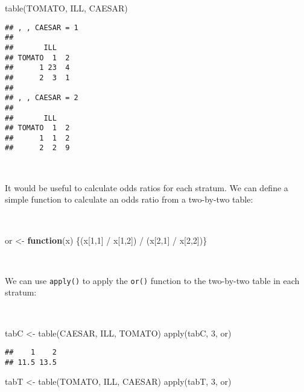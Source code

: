 \documentclass[
  12pt,
  a4paper]{book}
\newenvironment{Shaded}{\begin{snugshade}}{\end{snugshade}}
\newcommand{\ControlFlowTok}[1]{\textcolor[rgb]{0.13,0.29,0.53}{\textbf{#1}}}
\newcommand{\DecValTok}[1]{\textcolor[rgb]{0.00,0.00,0.81}{#1}}
\newcommand{\FunctionTok}[1]{\textcolor[rgb]{0.00,0.00,0.00}{#1}}
\newcommand{\NormalTok}[1]{#1}
\newcommand{\OtherTok}[1]{\textcolor[rgb]{0.56,0.35,0.01}{#1}}
\newcommand{\SpecialCharTok}[1]{\textcolor[rgb]{0.00,0.00,0.00}{#1}}
\begin{document}
\newpage

\begin{Shaded}
\begin{Highlighting}[]
\FunctionTok{table}\NormalTok{(TOMATO, ILL, CAESAR)}
\end{Highlighting}
\end{Shaded}

\begin{verbatim}
## , , CAESAR = 1
## 
##       ILL
## TOMATO  1  2
##      1 23  4
##      2  3  1
## 
## , , CAESAR = 2
## 
##       ILL
## TOMATO  1  2
##      1  1  2
##      2  2  9
\end{verbatim}

~

It would be useful to calculate odds ratios for each stratum. We can define a simple function to calculate an odds ratio from a two-by-two table:

~

\begin{Shaded}
\begin{Highlighting}[]
\NormalTok{or }\OtherTok{\textless{}{-}} \ControlFlowTok{function}\NormalTok{(x) \{(x[}\DecValTok{1}\NormalTok{,}\DecValTok{1}\NormalTok{] }\SpecialCharTok{/}\NormalTok{ x[}\DecValTok{1}\NormalTok{,}\DecValTok{2}\NormalTok{]) }\SpecialCharTok{/}\NormalTok{ (x[}\DecValTok{2}\NormalTok{,}\DecValTok{1}\NormalTok{] }\SpecialCharTok{/}\NormalTok{ x[}\DecValTok{2}\NormalTok{,}\DecValTok{2}\NormalTok{])\}}
\end{Highlighting}
\end{Shaded}

~

We can use \texttt{apply()} to apply the \texttt{or()} function to the two-by-two table in each stratum:

~

\begin{Shaded}
\begin{Highlighting}[]
\NormalTok{tabC }\OtherTok{\textless{}{-}} \FunctionTok{table}\NormalTok{(CAESAR, ILL, TOMATO)}
\FunctionTok{apply}\NormalTok{(tabC, }\DecValTok{3}\NormalTok{, or)}
\end{Highlighting}
\end{Shaded}

\begin{verbatim}
##    1    2 
## 11.5 13.5
\end{verbatim}

\begin{Shaded}
\begin{Highlighting}[]
\NormalTok{tabT }\OtherTok{\textless{}{-}} \FunctionTok{table}\NormalTok{(TOMATO, ILL, CAESAR)}
\FunctionTok{apply}\NormalTok{(tabT, }\DecValTok{3}\NormalTok{, or)}
\end{Highlighting}
\end{Shaded}
\end{document}
